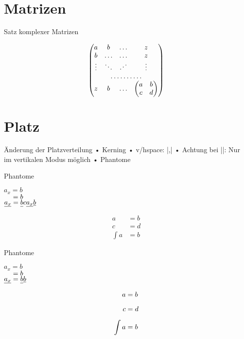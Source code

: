 \section{Matrizen}
\begin{frame}[fragile]{Satz komplexer Matrizen}
\begin{LTXexample}
\[\begin{pmatrix}
a & b & \dots & z\\
b & \dots & \dots & z\\
\vdots & \ddots& \reflectbox{$\ddots$} & \vdots\\
\hdotsfor{4}\\
z & b & \dots & \begin{pmatrix}
a & b \\ c & d\end{pmatrix}
\end{pmatrix}\]
\end{LTXexample}
\end{frame}

\section{Platz}
\begin{frame}[fragile]{Änderung der Platzverteilung}
• Kerning
• v/hspace: |\hspace{1cm},\hspace*{1cm}|
• Achtung bei |\vspace|: Nur im vertikalen Modus möglich
• Phantome
\•
\end{frame}

\begin{frame}[fragile]{Phantome}
\begin{LTXexample}[width=.4\textwidth]
$a_x = b$\\
$\hphantom{a_x} = b$\\
$\underline{a_x} = \underline{b\vphantom{a_x}} c \underline{a_x} \underline b$
\end{LTXexample}
\begin{LTXexample}
\begin{align*}
a &= b\\
c &= d\\
\int a &= b
\end{align*}
\end{LTXexample}

\end{frame}

\begin{frame}[fragile]{Phantome}
\begin{LTXexample}[width=.4\textwidth]
$a_x = b$\\
$\hphantom{a_x} = b$\\
$\underline{a_x} = \underline{b\vphantom{a_x}}\underline b$
\end{LTXexample}
\begin{LTXexample}
\begin{align*}
a &= b\\
\vphantom{\int} c &= d\\
\int a &= b
\end{align*}
\end{LTXexample}
\end{frame}

